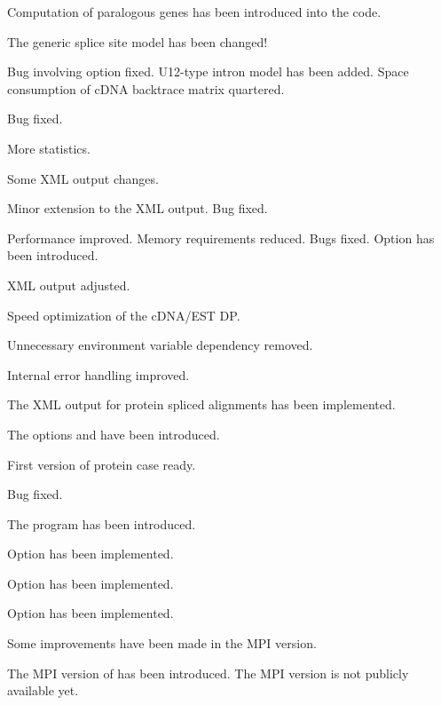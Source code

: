 \documentclass[11pt,a4paper,titlepage]{article}
\begin{document}
 Computation of paralogous genes has been introduced into the code.

 The generic splice site model has been changed! 

 Bug involving option  fixed. U12-type intron model has been added. Space consumption of cDNA backtrace matrix quartered.

 Bug fixed.

 More statistics. 

 Some XML output changes. 

 Minor extension to the XML output. Bug fixed.

 Performance improved. Memory requirements reduced. Bugs fixed. Option  has been introduced.

 XML output adjusted.

 Speed optimization of the cDNA/EST DP.

 Unnecessary environment variable dependency removed.

 Internal error handling improved.

 The XML output for protein spliced alignments has been implemented.

 The options  and  have been introduced.

 First version of protein case ready.

 Bug fixed.

 The \Callgthconsensus program has been introduced.

 Option  has been implemented.

 Option  has been implemented.

 Option  has been implemented. 

 Some improvements have been made in the MPI version.

 The MPI version of \Gth has been introduced. The MPI version is not publicly available yet.
\end{document}
